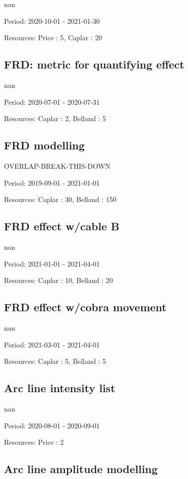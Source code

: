 nan

Period: 2020-10-01 - 2021-01-30

Resources: Price : 5, Caplar : 20

\subsection{FRD: metric for quantifying effect}

nan

Period: 2020-07-01 - 2020-07-31

Resources: Caplar : 2, Belland : 5

\subsection{FRD modelling}

OVERLAP-BREAK-THIS-DOWN

Period: 2019-09-01 - 2021-01-01

Resources: Caplar : 30, Belland : 150

\subsection{FRD effect w/cable B}

nan

Period: 2021-01-01 - 2021-04-01

Resources: Caplar : 10, Belland : 20

\subsection{FRD effect w/cobra movement}

nan

Period: 2021-03-01 - 2021-04-01

Resources: Caplar : 5, Belland : 5

\subsection{Arc line intensity list}

nan

Period: 2020-08-01 - 2020-09-01

Resources: Price : 2

\subsection{Arc line amplitude modelling}

